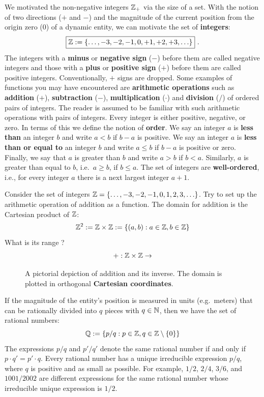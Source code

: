 We motivated the non-negative integers $\mathbb{Z}_+$ via the size of a set.  With the notion of two directions ($+$ and $-$) and the magnitude of the current position from the origin zero ($0$) of a dynamic entity, we can motivate the set of {\bf integers}:
$$\boxed{\mathbb{Z} := \{\ldots,-3,-2,-1,0,+1,+2,+3,\ldots\}} \ .$$
The integers with a {\bf minus} or {\bf negative sign} ($-$) before them are called negative integers and those with a {\bf plus} or {\bf positive sign} ($+$) before them are called positive integers.  Conventionally, $+$ signs are dropped.  Some examples of functions you may have encountered are {\bf arithmetic operations} such as {\bf addition} ($+$), {\bf subtraction} ($-$), {\bf multiplication} ($\cdot$) and {\bf division} ($/$) of ordered pairs of integers.  The reader is assumed to be familiar with such arithmetic operations with pairs of integers.  Every integer is either positive, negative, or zero.  In terms of this we define the notion of {\bf order}.  We say an integer $a$ is {\bf less than} an integer $b$ and write $a < b$ if $b-a$ is positive.  We say an integer $a$ is {\bf less than or equal to} an integer $b$ and write $a \leq b$ if $b-a$ is positive or zero.  Finally, we say that $a$ is greater than $b$ and write $a > b$ if $b<a$.  Similarly, $a$ is greater than equal to $b$, i.e.~$a \geq b$, if $b \leq a$.  The set of integers are {\bf well-ordered}, i.e., for every integer $a$ there is a next largest integer $a+1$.

\begin{classwork}\label{CW:AdditionMapAndItsInverseMap}
Consider the set of integers $\mathbb{Z} = \{\ldots,-3,-2,-1,0,1,2,3,\ldots\}$.  Try to set up the arithmetic operation of addition as a function.  The domain for addition is the Cartesian product of $\mathbb{Z}$:
\[
 \mathbb{Z}^2 := \mathbb{Z} \times \mathbb{Z} := \{(a,b) : a \in \mathbb{Z}, b \in \mathbb{Z} \}
\]  
What is its range ?  
\[
+ : \mathbb{Z} \times \mathbb{Z} \to
\]
\begin{figure}[htpb]
\caption{A pictorial depiction of addition and its inverse.  The domain is plotted in orthogonal  {\bf Cartesian coordinates}.\label{F:Addfunction}}
\vspace{5cm}
\end{figure}
\end{classwork}

If the magnitude of the entity's position is measured in units (e.g.~meters) that can be rationally divided into $q$ pieces with $q \in \mathbb{N}$, then we have the set of rational numbers:
\[
\mathbb{Q} := \{ {p}/{q} : p \in \mathbb{Z}, q \in \mathbb{Z} \setminus \{0\} \}
\] 
The expressions $p/q$ and $p'/q'$ denote the same rational number if and only if $p \cdot q'=p' \cdot q$.  Every rational number has a unique irreducible expression $p/q$, where $q$ is positive and as small as possible.  For example, $1/2$, $2/4$, $3/6$, and $1001/2002$ are different expressions for the same rational number whose irreducible unique expression is $1/2$.

